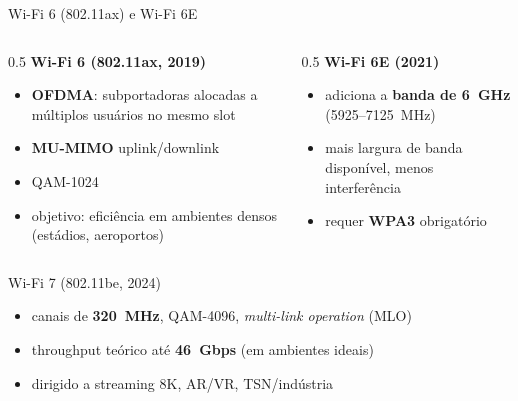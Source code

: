 \documentclass[aspectratio=169,11pt]{beamer}
\begin{document}
\begin{frame}{Wi-Fi 6 (802.11ax) e Wi-Fi 6E}
  \begin{columns}
    \begin{column}{0.5\textwidth}
      \textbf{Wi-Fi 6 (802.11ax, 2019)}
      \begin{itemize}
        \item \textbf{OFDMA}: subportadoras alocadas a múltiplos usuários no mesmo slot
        \item \textbf{MU-MIMO} uplink/downlink
        \item QAM-1024
        \item objetivo: eficiência em ambientes densos (estádios, aeroportos)
      \end{itemize}
    \end{column}
    \begin{column}{0.5\textwidth}
      \textbf{Wi-Fi 6E (2021)}
      \begin{itemize}
        \item adiciona a \textbf{banda de 6~GHz} (5925--7125~MHz)
        \item mais largura de banda disponível, menos interferência
        \item requer \textbf{WPA3} obrigatório
      \end{itemize}
    \end{column}
  \end{columns}
  \vspace{0.2cm}
  \pause
  \begin{block}{Wi-Fi 7 (802.11be, 2024)}
    \begin{itemize}
      \item canais de \textbf{320~MHz}, QAM-4096, \emph{multi-link operation} (MLO)
      \item throughput teórico até \textbf{46~Gbps} (em ambientes ideais)
      \item dirigido a streaming 8K, AR/VR, TSN/indústria
    \end{itemize}
  \end{block}
\end{frame}
\end{document}
